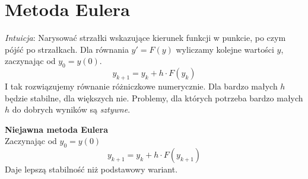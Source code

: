 \section{Metoda Eulera}
\textit{Intuicja}: Narysować strzałki wskazujące kierunek funkcji w punkcie, po czym pójść po strzałkach. Dla równania \( y' = F(y) \) wyliczamy kolejne wartości \( y \), zaczynając od \( y_0 = y(0) \).
\[
	y_{k+1} = y_k + h \cdot F(y_k)
\]
I tak rozwiązujemy równanie różniczkowe numerycznie. Dla bardzo małych \( h \) będzie stabilne, dla większych nie. Problemy, dla których potrzeba bardzo małych \( h \) do dobrych wyników są \textit{sztywne}.

\noindent
\textbf{Niejawna metoda Eulera} \\
Zaczynając od \( y_0 = y(0) \)
\[
	y_{k+1} = y_k + h \cdot F(y_{k+1})
\]
Daje lepszą stabilność niż podstawowy wariant.